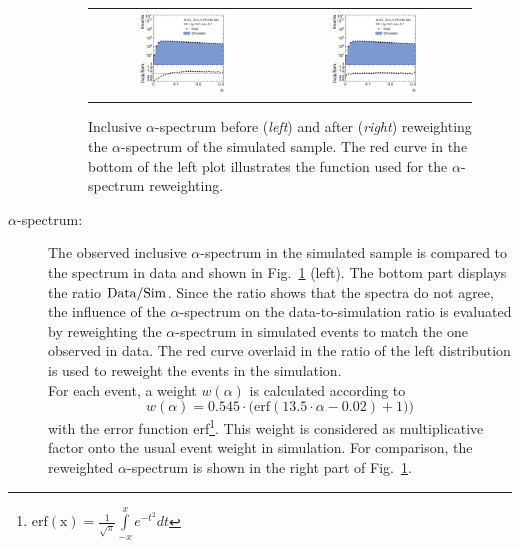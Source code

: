 \begin{description}
 \begin{figure}[!tp]
  \centering
  \begin{tabular}{cc}
                \includegraphics[width=0.49\textwidth]{figures/Alpha__AfterAsymmHistos.pdf} &
                \includegraphics[width=0.49\textwidth]{figures/AfterReweight_Alpha__AfterAsymmHistos.pdf}
  \end{tabular}
  \caption{Inclusive $\alpha$-spectrum before (\textit{left}) and after (\textit{right}) reweighting the $\alpha$-spectrum of the simulated sample. The red curve in the bottom of the left plot illustrates the function used for the $\alpha$-spectrum reweighting.}
  \label{fig:syst_uncert_alpha_spec}
\end{figure}
 
 \item[$\alpha$-spectrum:] The observed inclusive $\alpha$-spectrum in the simulated sample is compared to the spectrum in data and shown in Fig.~\ref{fig:syst_uncert_alpha_spec} (left). The bottom part displays the ratio $\rm{Data/Sim}$. Since the ratio shows that the spectra do not agree, the influence of the $\alpha$-spectrum on the data-to-simulation ratio is evaluated by reweighting the $\alpha$-spectrum in simulated events to match the one observed in data. The red curve overlaid in the ratio of the left distribution is used to reweight the events in the simulation. \\
For each event, a weight $w(\alpha)$ is calculated according to 
\begin{equation}
w(\alpha) = 0.545 \cdot \mathrm{(erf}(13.5 \cdot \alpha -0.02) +1))
\end{equation}
with the error function erf\footnote{ $\mathrm{erf(x)} = \frac{1}{\sqrt{\pi}} \int\limits_{-x}^{x} e^{-t^2} dt$}. This weight is considered as multiplicative factor onto the usual event weight in simulation. For comparison, the reweighted $\alpha$-spectrum is shown in the right part of Fig.~\ref{fig:syst_uncert_alpha_spec}.
 

\end{description}
